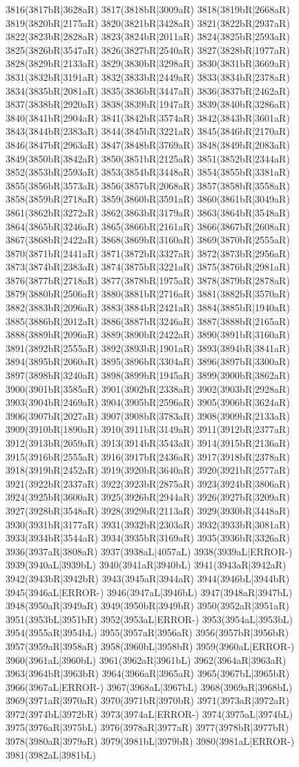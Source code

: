 3816(3817bR|3628aR) 3817(3818bR|3009aR) 3818(3819bR|2668aR) 3819(3820bR|2175aR) 3820(3821bR|3428aR) 3821(3822bR|2937aR) 3822(3823bR|2828aR) 3823(3824bR|2011aR) 3824(3825bR|2593aR) 3825(3826bR|3547aR) 3826(3827bR|2540aR) 3827(3828bR|1977aR) 3828(3829bR|2133aR) 3829(3830bR|3298aR) 3830(3831bR|3669aR) 3831(3832bR|3191aR) 3832(3833bR|2449aR) 3833(3834bR|2378aR) 3834(3835bR|2081aR) 3835(3836bR|3447aR) 3836(3837bR|2462aR) 3837(3838bR|2920aR) 3838(3839bR|1947aR) 3839(3840bR|3286aR) 3840(3841bR|2904aR) 3841(3842bR|3574aR) 3842(3843bR|3601aR) 3843(3844bR|2383aR) 3844(3845bR|3221aR) 3845(3846bR|2170aR) 3846(3847bR|2963aR) 3847(3848bR|3769aR) 3848(3849bR|2083aR) 3849(3850bR|3842aR) 3850(3851bR|2125aR) 3851(3852bR|2344aR) 3852(3853bR|2593aR) 3853(3854bR|3448aR) 3854(3855bR|3381aR) 3855(3856bR|3573aR) 3856(3857bR|2068aR) 3857(3858bR|3558aR) 3858(3859bR|2718aR) 3859(3860bR|3591aR) 3860(3861bR|3049aR) 3861(3862bR|3272aR) 3862(3863bR|3179aR) 3863(3864bR|3548aR) 3864(3865bR|3246aR) 3865(3866bR|2161aR) 3866(3867bR|2608aR) 3867(3868bR|2422aR) 3868(3869bR|3160aR) 3869(3870bR|2555aR) 3870(3871bR|2441aR) 3871(3872bR|3327aR) 3872(3873bR|2956aR) 3873(3874bR|2383aR) 3874(3875bR|3221aR) 3875(3876bR|2981aR) 3876(3877bR|2718aR) 3877(3878bR|1975aR) 3878(3879bR|2878aR) 3879(3880bR|2506aR) 3880(3881bR|2716aR) 3881(3882bR|3570aR) 3882(3883bR|2096aR) 3883(3884bR|2421aR) 3884(3885bR|1940aR) 3885(3886bR|2012aR) 3886(3887bR|3246aR) 3887(3888bR|2165aR) 3888(3889bR|2096aR) 3889(3890bR|2422aR) 3890(3891bR|3160aR) 3891(3892bR|2555aR) 3892(3893bR|1901aR) 3893(3894bR|3841aR) 3894(3895bR|2060aR) 3895(3896bR|3304aR) 3896(3897bR|3300aR) 3897(3898bR|3240aR) 3898(3899bR|1945aR) 3899(3900bR|3862aR) 3900(3901bR|3585aR) 3901(3902bR|2338aR) 3902(3903bR|2928aR) 3903(3904bR|2469aR) 3904(3905bR|2596aR) 3905(3906bR|3624aR) 3906(3907bR|2027aR) 3907(3908bR|3783aR) 3908(3909bR|2133aR) 3909(3910bR|1890aR) 3910(3911bR|3149aR) 3911(3912bR|2377aR) 3912(3913bR|2059aR) 3913(3914bR|3543aR) 3914(3915bR|2136aR) 3915(3916bR|2555aR) 3916(3917bR|2436aR) 3917(3918bR|2378aR) 3918(3919bR|2452aR) 3919(3920bR|3640aR) 3920(3921bR|2577aR) 3921(3922bR|2337aR) 3922(3923bR|2875aR) 3923(3924bR|3806aR) 3924(3925bR|3600aR) 3925(3926bR|2944aR) 3926(3927bR|3209aR) 3927(3928bR|3548aR) 3928(3929bR|2113aR) 3929(3930bR|3448aR) 3930(3931bR|3177aR) 3931(3932bR|2303aR) 3932(3933bR|3081aR) 3933(3934bR|3544aR) 3934(3935bR|3169aR) 3935(3936bR|3326aR) 3936(3937aR|3808aR) 3937(3938aL|4057aL) 3938(3939aL|ERROR-) 3939(3940aL|3939bL) 3940(3941aR|3940bL) 3941(3943aR|3942aR) 3942(3943bR|3942bR) 3943(3945aR|3944aR) 3944(3946bL|3944bR) 3945(3946aL|ERROR-) 3946(3947aL|3946bL) 3947(3948aR|3947bL) 3948(3950aR|3949aR) 3949(3950bR|3949bR) 3950(3952aR|3951aR) 3951(3953bL|3951bR) 3952(3953aL|ERROR-) 3953(3954aL|3953bL) 3954(3955aR|3954bL) 3955(3957aR|3956aR) 3956(3957bR|3956bR) 3957(3959aR|3958aR) 3958(3960bL|3958bR) 3959(3960aL|ERROR-) 3960(3961aL|3960bL) 3961(3962aR|3961bL) 3962(3964aR|3963aR) 3963(3964bR|3963bR) 3964(3966aR|3965aR) 3965(3967bL|3965bR) 3966(3967aL|ERROR-) 3967(3968aL|3967bL) 3968(3969aR|3968bL) 3969(3971aR|3970aR) 3970(3971bR|3970bR) 3971(3973aR|3972aR) 3972(3974bL|3972bR) 3973(3974aL|ERROR-) 3974(3975aL|3974bL) 3975(3976aR|3975bL) 3976(3978aR|3977aR) 3977(3978bR|3977bR) 3978(3980aR|3979aR) 3979(3981bL|3979bR) 3980(3981aL|ERROR-) 3981(3982aL|3981bL) 